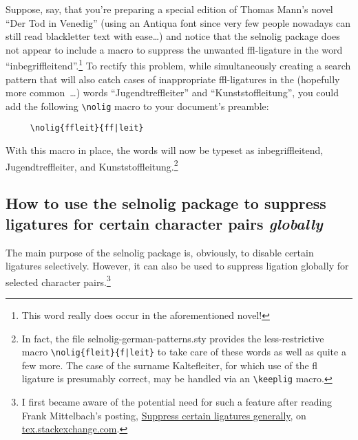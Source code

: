 \documentclass[12pt]{article}
\newcommand{\pkg}[1]{\textsf{#1}}
\newcommand{\cmmd}[1]{\texttt{\textbackslash #1}}
\begin{document}
Suppose, say, that you're preparing a special edition of Thomas Mann's novel \enquote{Der Tod in Venedig} (using an Antiqua font since very few people nowadays can still read {\blackletterfont blackletter} text with ease\dots) and notice that the \pkg{selnolig} package does not appear to include a macro to suppress the unwanted ffl-ligature in the word \enquote{inbegri\mbox{ffl}eitend}.\footnote{This word really does occur in the aforementioned novel!} To rectify this problem, while simultaneously creating a search pattern that will also catch cases of inappropriate ffl-ligatures in the (hopefully more common~\ldots) words  \enquote{Jugendtre\mbox{ffl}eiter} and \enquote{Kunststo\mbox{ffl}eitung}, you could add the following \Verb+\nolig+ macro to your document's preamble:
\begin{Verbatim}
     \nolig{ffleit}{ff|leit}
\end{Verbatim}
With this macro in place, the words will now be typeset as inbegriffleitend, Jugendtreffleiter, and Kunststoffleitung.\footnote{In fact, the file \pkg{selnolig-german-patterns.sty} provides the less-restrictive macro \Verb+\nolig{fleit}{f|leit}+ to take care of these words as well as quite a few more. The case of the surname Kaltefleiter, for which use of the fl ligature is presumably correct, may be handled via an \cmmd{keeplig} macro.}



\subsection[How to use the selnolig package to suppress ligatures for certain character pairs globally]{How to use the selnolig package to suppress ligatures for certain character pairs \emph{globally}}
\label{sec:global-nolig}


The main purpose of the \pkg{selnolig} package is, obviously, to disable certain ligatures selectively. However, it can also be used to suppress ligation globally for selected character pairs.\footnote{I first became aware of the potential need for such a feature after reading Frank Mittelbach's posting, \href{http://tex.stackexchange.com/q/61042/5001}{Suppress certain ligatures generally}, on \url{tex.stackexchange.com}.}

\bgroup \ebg
\end{document}
